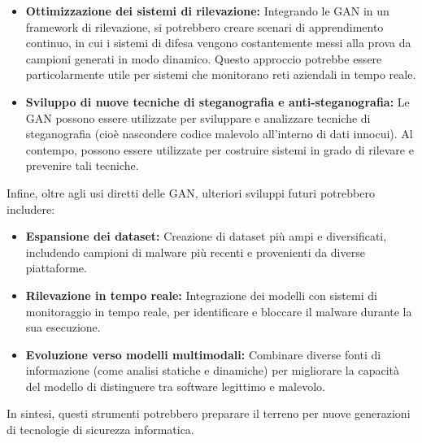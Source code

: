 \begin{itemize}
    \item \textbf{Ottimizzazione dei sistemi di rilevazione:} Integrando le GAN in un framework di rilevazione, si potrebbero creare scenari di apprendimento continuo, in cui i sistemi di difesa vengono costantemente messi alla prova da campioni generati in modo dinamico. Questo approccio potrebbe essere particolarmente utile per sistemi che monitorano reti aziendali in tempo reale.

    \item \textbf{Sviluppo di nuove tecniche di steganografia e anti-steganografia:} Le GAN possono essere utilizzate per sviluppare e analizzare tecniche di steganografia (cioè nascondere codice malevolo all'interno di dati innocui). Al contempo, possono essere utilizzate per costruire sistemi in grado di rilevare e prevenire tali tecniche.
\end{itemize}

Infine, oltre agli usi diretti delle GAN, ulteriori sviluppi futuri potrebbero includere:
\begin{itemize}
    \item \textbf{Espansione dei dataset:} Creazione di dataset più ampi e diversificati, includendo campioni di malware più recenti e provenienti da diverse piattaforme.
    \item \textbf{Rilevazione in tempo reale:} Integrazione dei modelli con sistemi di monitoraggio in tempo reale, per identificare e bloccare il malware durante la sua esecuzione.
    \item \textbf{Evoluzione verso modelli multimodali:} Combinare diverse fonti di informazione (come analisi statiche e dinamiche) per migliorare la capacità del modello di distinguere tra software legittimo e malevolo.
\end{itemize}

In sintesi, questi strumenti potrebbero preparare il terreno per nuove generazioni di tecnologie di sicurezza informatica.